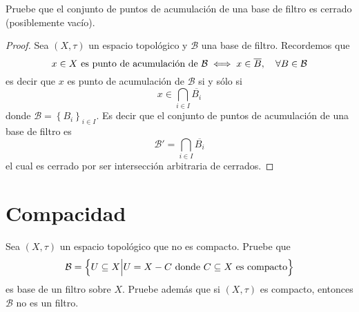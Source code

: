\documentclass[12pt]{report}
\theoremstyle{largebreak}
\newcommand{\Cls}[1]{\ensuremath{\overline{#1}}}
\begin{document}
    \begin{excer}
        Pruebe que el conjunto de puntos de acumulación de una base de filtro es cerrado (posiblemente vacío).
    \end{excer}

    \begin{proof}
        Sea $(X,\tau)$ un espacio topológico y $\mathcal{B}$ una base de filtro. Recordemos que
        \begin{equation*}
            x\in X\textup{ es punto de acumulación de }\mathcal{B}\iff x\in \Cls{B},\quad\forall B\in\mathcal{B}
        \end{equation*}
        es decir que $x$ es punto de acumulación de $\mathcal{B}$ si y sólo si
        \begin{equation*}
            x\in\bigcap_{ i\in I}\Cls{B_i}
        \end{equation*}
        donde $\mathcal{B}=\left\{B_i\right\}_{ i\in I}$. Es decir que el conjunto de puntos de acumulación de una base de filtro es
        \begin{equation*}
            \mathcal{B}'=\bigcap_{ i\in I}\Cls{B_i}
        \end{equation*}
        el cual es cerrado por ser intersección arbitraria de cerrados.
    \end{proof}

    \section{Compacidad}

    \begin{excer}
        Sea $(X,\tau)$ un espacio topológico que no es compacto. Pruebe que
        \begin{equation*}
            \mathcal{B}=\left\{U\subseteq X\Big|U=X-C\textup{ donde }C\subseteq X\textup{ es compacto} \right\}
        \end{equation*}
        es base de un filtro sobre $X$. Pruebe además que si $(X,\tau)$ es compacto, entonces $\mathcal{B}$ no es un filtro.
    \end{excer}
\end{document}
